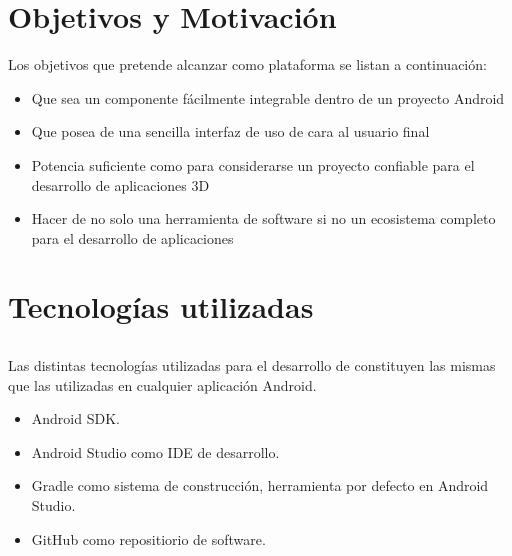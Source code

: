 
\section{Objetivos y Motivación}
Los objetivos que \robotto pretende alcanzar como plataforma se listan a continuación:

\begin{itemize}
\item Que sea un componente fácilmente integrable dentro de un proyecto Android
\item Que posea de una sencilla interfaz de uso de cara al usuario final
\item Potencia suficiente como para considerarse un proyecto confiable para el desarrollo de aplicaciones 3D
\item Hacer de \robotto no solo una herramienta de software si no un ecosistema completo para el desarrollo de aplicaciones
\end{itemize}

\section{Tecnologías utilizadas}

\subsection{\robotto}

Las distintas tecnologías utilizadas para el desarrollo de \robotto constituyen las mismas que las utilizadas en cualquier aplicación Android.

\begin{itemize}
\item Android SDK.
\item Android Studio como IDE de desarrollo.
\item Gradle como sistema de construcción, herramienta por defecto en Android Studio.
\item GitHub como repositiorio de software.
\end{itemize}

